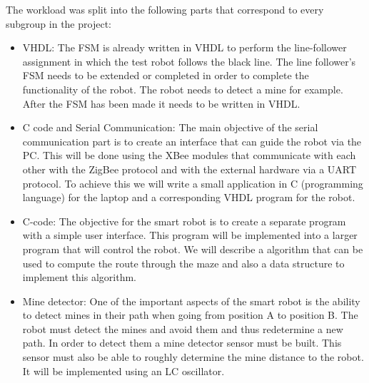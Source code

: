 \newpage
The workload was split into the following parts that correspond to every subgroup in the project:\\ 

\begin{itemize}
    \item VHDL: The FSM is already written in VHDL to perform the line-follower assignment in which the test robot follows the black line. The line follower’s FSM needs to be extended or completed in order to complete the functionality of the robot. The robot needs to detect a mine for example. After the FSM has been made it needs to be written in VHDL.

    \item C code and Serial Communication: The main objective of the serial communication part is to create an interface that can guide the robot via the PC. This will be done using the XBee modules that communicate with each other with the ZigBee protocol and with the external hardware via a UART protocol. To achieve this we will write a small application in C (programming language)  for the laptop and a corresponding VHDL program for the robot.
    
    \item C-code: The objective for the smart robot is to create a separate program with a simple user interface. This program will be implemented into a larger program that will control the robot. We will describe a algorithm that can be used to compute the route through the maze and also a data structure to implement this algorithm. 

    \item Mine detector: One of the important aspects of the smart robot is the ability to detect mines in their path when going from position A to position B. The robot must detect the mines and avoid them and thus redetermine a new path. In order to detect them a mine detector sensor must be built. This sensor must also be able to roughly determine the mine distance to the robot. It will be implemented using an LC oscillator.
\end{itemize}


